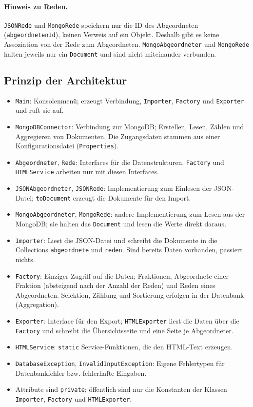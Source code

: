 \paragraph{Hinweis zu Reden.}
\texttt{JSONRede} und \texttt{MongoRede} speichern nur die ID des Abgeordneten (\texttt{abgeordnetenId}), keinen Verweis auf ein Objekt. Deshalb gibt es keine Assoziation von der Rede zum Abgeordneten. \texttt{MongoAbgeordneter} und \texttt{MongoRede} halten jeweils nur ein \texttt{Document} und sind nicht miteinander verbunden.

\subsection{Prinzip der Architektur}
\begin{itemize}
    \item \texttt{Main}: Konsolenmenü; erzeugt Verbindung, \texttt{Importer}, \texttt{Factory} und \texttt{Exporter} und ruft sie auf.
    \item \texttt{MongoDBConnector}: Verbindung zur MongoDB; Erstellen, Lesen, Zählen und Aggregieren von Dokumenten. Die Zugangsdaten stammen aus einer Konfigurationsdatei (\texttt{Properties}).
    \item \texttt{Abgeordneter}, \texttt{Rede}: Interfaces für die Datenstrukturen. \texttt{Factory} und \texttt{HTMLService} arbeiten nur mit diesen Interfaces.
    \item \texttt{JSONAbgeordneter}, \texttt{JSONRede}: Implementierung zum Einlesen der JSON-Datei; \texttt{toDocument} erzeugt die Dokumente für den Import.
    \item \texttt{MongoAbgeordneter}, \texttt{MongoRede}: andere Implementierung zum Lesen aus der MongoDB; sie halten das \texttt{Document} und lesen die Werte direkt daraus.
    \item \texttt{Importer}: Liest die JSON-Datei und schreibt die Dokumente in die Collections \texttt{abgeordnete} und \texttt{reden}. Sind bereits Daten vorhanden, passiert nichts.
    \item \texttt{Factory}: Einziger Zugriff auf die Daten; Fraktionen, Abgeordnete einer Fraktion (absteigend nach der Anzahl der Reden) und Reden eines Abgeordneten. Selektion, Zählung und Sortierung erfolgen in der Datenbank (Aggregation).
    \item \texttt{Exporter}: Interface für den Export; \texttt{HTMLExporter} liest die Daten über die \texttt{Factory} und schreibt die Übersichtsseite und eine Seite je Abgeordneter.
    \item \texttt{HTMLService}: \texttt{static} Service-Funktionen, die den HTML-Text erzeugen.
    \item \texttt{DatabaseException}, \texttt{InvalidInputException}: Eigene Fehlertypen für Datenbankfehler bzw. fehlerhafte Eingaben.
    \item Attribute sind \texttt{private}; öffentlich sind nur die Konstanten der Klassen \texttt{Importer}, \texttt{Factory} und \texttt{HTMLExporter}.
\end{itemize}

